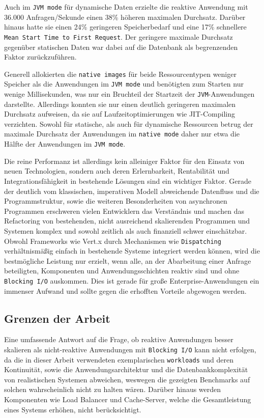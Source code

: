 Auch im \verb|JVM mode| für dynamische Daten erzielte die reaktive Anwendung mit 36.000 Anfragen/Sekunde einen 38\% höheren maximalen Durchsatz.
Darüber hinaus hatte sie einen 24\% geringeren Speicherbedarf und eine 17\% schnellere \newline\verb|Mean Start Time to First Request|.
Der geringere maximale Durchsatz gegenüber statischen Daten war dabei auf die Datenbank als begrenzenden Faktor zurückzuführen.

Generell allokierten die \verb|native images| für beide Ressourcentypen weniger Speicher als die Anwendungen im \verb|JVM mode|
und benötigten zum Starten nur wenige Millisekunden,
was nur ein Bruchteil der Startzeit der \verb|JVM|-Anwendungen darstellte. Allerdings konnten sie nur einen deutlich
geringeren maximalen Durchsatz aufweisen, da sie auf Laufzeitoptimierungen wie JIT-Compiling verzichten.
Sowohl für statische, als auch für dynamische Ressourcen betrug der maximale Durchsatz der Anwendungen im \verb|native mode|
daher nur etwa die Hälfte der Anwendungen im \verb|JVM mode|.

Die reine Performanz ist allerdings kein alleiniger Faktor für den Einsatz von neuen Technologien, sondern auch deren
Erlernbarkeit, Rentabilität und Integrationsfähigkeit in bestehende Lösungen sind ein wichtiger Faktor.
Gerade der deutlich vom klassischen, imperativen Modell abweichende Datenfluss und die Programmstruktur, sowie die weiteren Besonderheiten
von asynchronen Programmen erschweren vielen Entwicklern das Verständnis und machen das Refactoring von bestehenden, nicht ausreichend
skalierenden Programmen und Systemen komplex und sowohl zeitlich als auch finanziell schwer einschätzbar.
Obwohl Frameworks wie Vert.x durch Mechanismen wie \verb|Dispatching| verhältnismäßig einfach in bestehende Systeme integriert werden
können, wird die bestmögliche Leistung nur erzielt, wenn alle, an der Abarbeitung einer Anfrage beteiligten, Komponenten und
Anwendungsschichten reaktiv sind und ohne \verb|Blocking I/O| auskommen. Dies ist gerade für
große Enterprise-Anwendungen ein immenser Aufwand und sollte gegen die erhofften Vorteile abgewogen werden.

\subsection{Grenzen der Arbeit}
\label{subsec:grenzen_der_arbeit}
Eine umfassende Antwort auf die Frage, ob reaktive Anwendungen besser skalieren als nicht-reaktive Anwendungen
mit \verb|Blocking I/O| kann nicht erfolgen, da die in dieser Arbeit verwendeten exemplarischen \verb|workloads| und deren Kontinuität, sowie
die Anwendungsarchitektur und die Datenbankkomplexität von realistischen Systemen abweichen, weswegen die gezeigten Benchmarks auf solchen
wahrscheinlich nicht zu halten wären.
Darüber hinaus werden Komponenten wie Load Balancer und Cache-Server, welche die Gesamtleistung eines Systems erhöhen,
nicht berücksichtigt.

